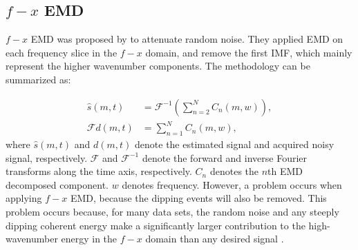 


\subsection{$f-x$ EMD}
$f-x$ EMD was proposed by \cite{bekara} to attenuate random noise. They applied EMD on
each frequency slice in the $f-x$ domain, and remove the first IMF,
which mainly represent the higher wavenumber components. The methodology can be summarized as:

\begin{equation}
\label{eq:fxemd}
\begin{split}
\hat{s}(m,t) &= \mathcal{F}^{-1}\left(\sum_{n=2}^{N}C_n(m,w)\right), \\
\mathcal{F} d(m,t)  &= \sum_{n=1}^{N} C_n(m,w),
\end{split}
\end{equation}
where $\hat{s}(m,t)$ and $d(m,t)$ denote the estimated signal and acquired noisy signal, respectively. $\mathcal{F}$ and $\mathcal{F}^{-1}$ denote the forward and inverse Fourier transforms along the time axis, respectively. $C_n$ denotes the $n$th EMD decomposed component. $w$ denotes frequency. However, a problem occurs when applying $f-x$
EMD, because the dipping events will also be removed.
This problem occurs because, for many data sets, the random noise and any steeply dipping coherent
energy make a significantly larger contribution to the high-wavenumber energy in the $f-x$
domain than any desired signal \cite[]{bekara}.

